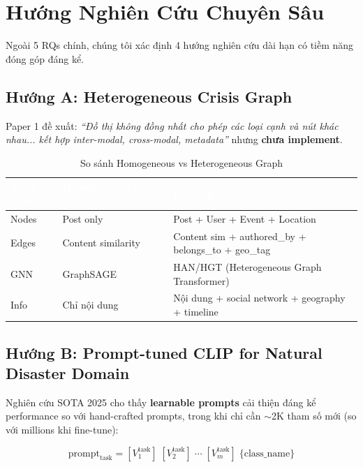\documentclass[12pt,a4paper]{article}
\begin{document}
\section{Hướng Nghiên Cứu Chuyên Sâu}

Ngoài 5 RQs chính, chúng tôi xác định 4 hướng nghiên cứu dài hạn có tiềm năng đóng góp đáng kể.

\subsection{Hướng A: Heterogeneous Crisis Graph}

Paper 1 đề xuất: \textit{``Đồ thị không đồng nhất cho phép các loại cạnh và nút khác nhau... kết hợp inter-modal, cross-modal, metadata''} nhưng \textbf{chưa implement}.

\begin{table}[H]
\centering
\caption{So sánh Homogeneous vs Heterogeneous Graph}
\begin{tabularx}{\textwidth}{l X X}
\toprule
\rowcolor{tableheader}
\textcolor{white}{\textbf{Khía cạnh}} & \textcolor{white}{\textbf{Homogeneous (hiện tại)}} & \textcolor{white}{\textbf{Heterogeneous (đề xuất)}} \\
\midrule
Nodes & Post only & Post + User + Event + Location \\
Edges & Content similarity & Content sim + authored\_by + belongs\_to + geo\_tag \\
GNN & GraphSAGE & HAN/HGT (Heterogeneous Graph Transformer) \\
Info & Chỉ nội dung & Nội dung + social network + geography + timeline \\
\bottomrule
\end{tabularx}
\end{table}

\subsection{Hướng B: Prompt-tuned CLIP for Natural Disaster Domain}

Nghiên cứu SOTA 2025 cho thấy \textbf{learnable prompts} cải thiện đáng kể performance so với hand-crafted prompts, trong khi chỉ cần $\sim$2K tham số mới (so với millions khi fine-tune):

\begin{equation}
\text{prompt}_{\text{task}} = [V_1^{\text{task}}]\;[V_2^{\text{task}}]\;\cdots\;[V_m^{\text{task}}]\;\text{\{class\_name\}}
\end{equation}
\end{document}
